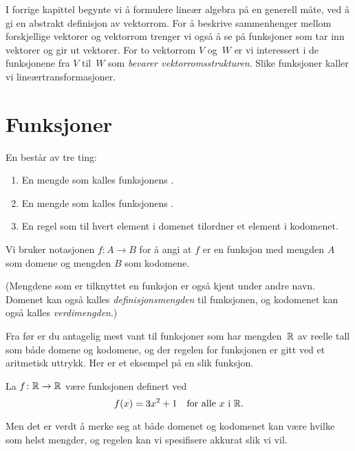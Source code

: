 

\label{ch:lineartransformasjoner}

I forrige kapittel begynte vi å formulere lineær algebra på en
generell måte, ved å gi en abstrakt definisjon av vektorrom.  For å
beskrive sammenhenger mellom forskjellige vektorer og vektorrom
trenger vi også å se på funksjoner som tar inn vektorer og gir ut
vektorer.  For to vektorrom $V$ og~$W$ er vi interessert i de
funksjonene fra $V$ til~$W$ som \emph{bevarer vektorromsstrukturen}.
Slike funksjoner kaller vi lineærtransformasjoner.


\section*{Funksjoner}

En  består av tre ting:
\begin{enumerate}
\item En mengde som kalles funksjonens .
\item En mengde som kalles funksjonens .
\item En regel som til hvert element i domenet tilordner et element i
kodomenet.
\end{enumerate}
Vi bruker notasjonen $f \colon A \to B$ for å angi at $f$ er en
funksjon med mengden $A$ som domene og mengden $B$ som kodomene.

(Mengdene som er tilknyttet en funksjon er også kjent under andre
navn.  Domenet kan også kalles \emph{definisjonsmengden} til
funksjonen, og kodomenet kan også kalles \emph{verdimengden}.)

Fra før er du antagelig mest vant til funksjoner som har mengden~$\mathbb{R}$
av reelle tall som både domene og kodomene, og der regelen for
funksjonen er gitt ved et aritmetisk uttrykk.  Her er et eksempel på
en slik funksjon.

\begin{ex}
\label{ex:funksjon1}
La $f \colon \mathbb{R} \to \mathbb{R}$ være funksjonen definert ved
\[
f(x) = 3x^2 + 1
\quad\text{for alle $x$ i~$\mathbb{R}$.}
\]
\end{ex}

Men det er verdt å merke seg at både domenet og kodomenet kan være
hvilke som helst mengder, og regelen kan vi spesifisere akkurat slik
vi vil.

